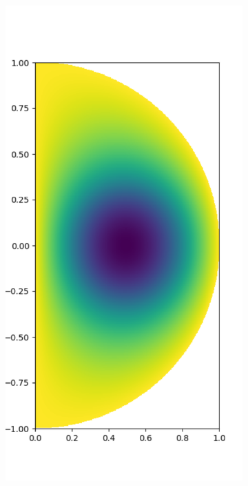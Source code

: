 \documentclass[11pt, oneside]{article}   	%
\begin{document}
\begin{figure}[t]
\begin{subfigure}{0.3\textwidth}
	\includegraphics[scale=0.3]{solution-poisson}
	\centering
	\end{subfigure}
	\begin{subfigure}{0.5\textwidth}
	\centering

\end{subfigure}
\end{figure}
\end{document}
